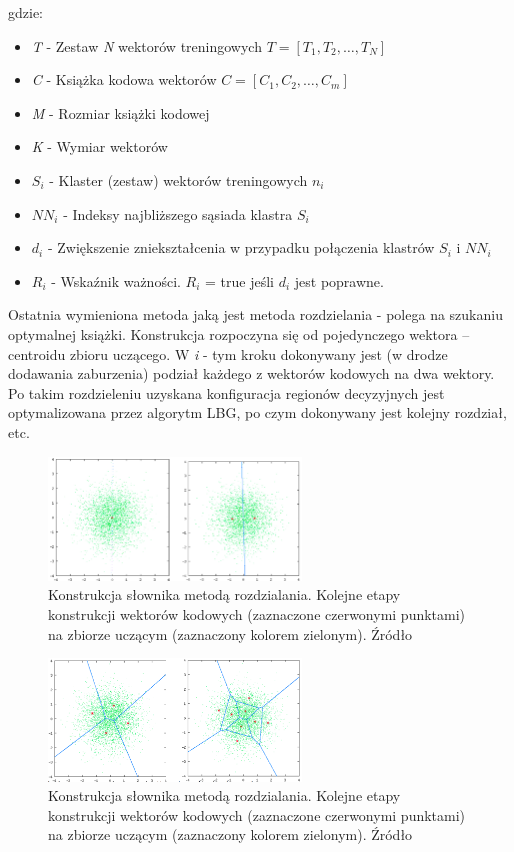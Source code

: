\documentclass{article}
\begin{document}
gdzie:
\begin{itemize}[label=]
    \item \textit{T} - Zestaw \textit{N} wektorów treningowych $T = {[T_{1}, T_{2}, \dots, T_{N}]}$
    \item \textit{C} - Książka kodowa wektorów $C = {[C_{1}, C_{2}, \dots, C_{m}]}$
    \item \textit{M} - Rozmiar książki kodowej
    \item \textit{K} - Wymiar wektorów
    \item \textit{$S_{i}$} - Klaster (zestaw) wektorów treningowych $n_{i}$
    \item \textit{$NN_{i}$} - Indeksy najbliższego sąsiada klastra $S_{i}$
    \item \textit{$d_{i}$} - Zwiększenie zniekształcenia w przypadku połączenia klastrów $S_{i}$ i $NN_{i}$
    \item \textit{$R_{i}$} - Wskaźnik ważności. $R_{i}$ = true jeśli $d_{i}$ jest poprawne. 
\end{itemize}

Ostatnia wymieniona metoda jaką jest metoda rozdzielania - polega na szukaniu optymalnej książki. Konstrukcja rozpoczyna się od pojedynczego wektora – centroidu zbioru uczącego. W \textit{i} - tym kroku dokonywany jest (w drodze dodawania zaburzenia) podział każdego z wektorów kodowych na dwa wektory. Po takim rozdzieleniu uzyskana konfiguracja regionów decyzyjnych jest optymalizowana przez algorytm LBG, po czym dokonywany jest kolejny rozdział, etc.

\begin{figure}[H]
    \centering
    \includegraphics[width=0.6\textwidth]{images/rodzielania_1.png}
    \caption{Konstrukcja słownika metodą rozdzialania. Kolejne etapy konstrukcji wektorów kodowych (zaznaczone czerwonymi punktami) na zbiorze uczącym (zaznaczony kolorem zielonym).  Źródło \cite{mwilczewski}}
    \label{fig:crossing}
\end{figure}

\begin{figure}[H]
    \centering
    \includegraphics[width=0.6\textwidth]{images/rodzielania_2.png}
    \caption{Konstrukcja słownika metodą rozdzialania. Kolejne etapy konstrukcji wektorów kodowych (zaznaczone czerwonymi punktami) na zbiorze uczącym (zaznaczony kolorem zielonym).  Źródło \cite{mwilczewski}}
    \label{fig:crossing}
\end{figure}
\end{document}
